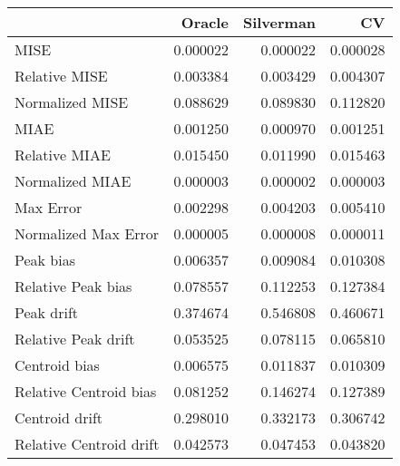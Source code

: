 \begin{tabular}{lrrr}
  \hline
 & Oracle & Silverman & CV \\ 
  \hline
MISE & 0.000022 & 0.000022 & 0.000028 \\ 
  Relative MISE & 0.003384 & 0.003429 & 0.004307 \\ 
  Normalized MISE & 0.088629 & 0.089830 & 0.112820 \\ 
  MIAE & 0.001250 & 0.000970 & 0.001251 \\ 
  Relative MIAE & 0.015450 & 0.011990 & 0.015463 \\ 
  Normalized MIAE & 0.000003 & 0.000002 & 0.000003 \\ 
  Max Error & 0.002298 & 0.004203 & 0.005410 \\ 
  Normalized Max Error & 0.000005 & 0.000008 & 0.000011 \\ 
  Peak bias & 0.006357 & 0.009084 & 0.010308 \\ 
  Relative Peak bias & 0.078557 & 0.112253 & 0.127384 \\ 
  Peak drift & 0.374674 & 0.546808 & 0.460671 \\ 
  Relative Peak drift & 0.053525 & 0.078115 & 0.065810 \\ 
  Centroid bias & 0.006575 & 0.011837 & 0.010309 \\ 
  Relative Centroid bias & 0.081252 & 0.146274 & 0.127389 \\ 
  Centroid drift & 0.298010 & 0.332173 & 0.306742 \\ 
  Relative Centroid drift & 0.042573 & 0.047453 & 0.043820 \\ 
   \hline
\end{tabular}
